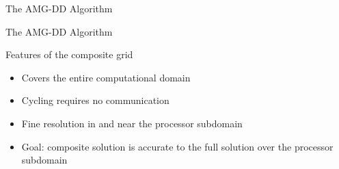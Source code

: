 \documentclass[18pt,xcolor=table]{beamer}
\begin{document}
\begin{frame}{The AMG-DD Algorithm}
\end{frame}

\begin{frame}{The AMG-DD Algorithm}
\begin{block}{Features of the composite grid}
\begin{itemize}
\item Covers the entire computational domain
\item Cycling requires no communication 
\item Fine resolution in and near the processor subdomain
\item Goal: composite solution is accurate to the full solution over the processor subdomain
\end{itemize}
\end{block}

\end{frame}
\end{document}
